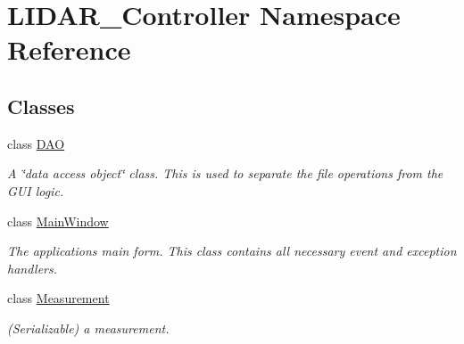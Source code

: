 \hypertarget{namespace_l_i_d_a_r___controller}{}\section{L\+I\+D\+A\+R\+\_\+\+Controller Namespace Reference}
\label{namespace_l_i_d_a_r___controller}
\subsection*{Classes}
\begin{DoxyCompactItemize}
\item 
class \hyperlink{class_l_i_d_a_r___controller_1_1_d_a_o}{D\+AO}
\begin{DoxyCompactList}\small\item\em A \char`\"{}data access object\char`\"{} class. This is used to separate the file operations from the G\+UI logic. \end{DoxyCompactList}\item 
class \hyperlink{class_l_i_d_a_r___controller_1_1_main_window}{Main\+Window}
\begin{DoxyCompactList}\small\item\em The application\textquotesingle{}s main form. This class contains all necessary event and exception handlers. \end{DoxyCompactList}\item 
class \hyperlink{class_l_i_d_a_r___controller_1_1_measurement}{Measurement}
\begin{DoxyCompactList}\small\item\em (Serializable) a measurement. \end{DoxyCompactList}\end{DoxyCompactItemize}
